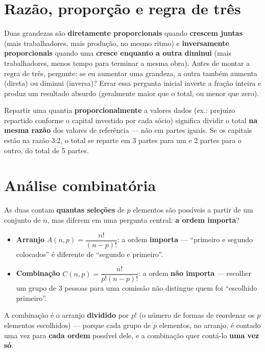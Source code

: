\section{Razão, proporção e regra de três}

\begin{conceito}
Duas grandezas são \textbf{diretamente proporcionais} quando \textbf{crescem
juntas} (mais trabalhadores, mais produção, no mesmo ritmo) e
\textbf{inversamente proporcionais} quando uma \textbf{cresce enquanto a
outra diminui} (mais trabalhadores, menos tempo para terminar a mesma
obra). Antes de montar a regra de três, pergunte: se eu aumentar uma
grandeza, a outra também aumenta (direta) ou diminui (inversa)? Errar essa
pergunta inicial inverte a fração inteira e produz um resultado absurdo
(geralmente maior que o total, ou menor que zero).
\end{conceito}

\begin{regrapratica}
Repartir uma quantia \textbf{proporcionalmente} a valores dados (ex.:
prejuízo repartido conforme o capital investido por cada sócio) significa
dividir o total \textbf{na mesma razão} dos valores de referência --- não
em partes iguais. Se os capitais estão na razão 3:2, o total se reparte em
3 partes para um e 2 partes para o outro, do total de 5 partes.
\end{regrapratica}

\section{Análise combinatória}

\begin{conceito}
As duas contam \textbf{quantas seleções} de $p$ elementos são possíveis a
partir de um conjunto de $n$, mas diferem em uma pergunta central: \textbf{a
ordem importa}?

\begin{itemize}
\item \textbf{Arranjo} $A(n,p) = \dfrac{n!}{(n-p)!}$: a ordem \textbf{importa}
--- “primeiro e segundo colocados” é diferente de “segundo e primeiro”.
\item \textbf{Combinação} $C(n,p) = \dfrac{n!}{p!(n-p)!}$: a ordem \textbf{não
importa} --- escolher um grupo de 3 pessoas para uma comissão não distingue
quem foi “escolhido primeiro”.
\end{itemize}

A combinação é o arranjo \textbf{dividido} por $p!$ (o número de formas de
reordenar os $p$ elementos escolhidos) --- porque cada grupo de $p$
elementos, no arranjo, é contado uma vez para \textbf{cada ordem} possível
dele, e a combinação quer contá-lo \textbf{uma vez só}.
\end{conceito}

